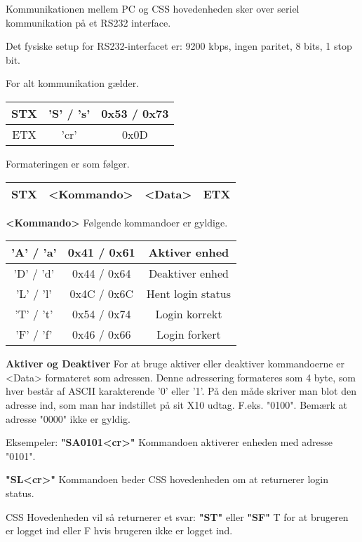 Kommunikationen mellem PC og CSS hovedenheden sker over seriel kommunikation på et RS232 interface.

Det fysiske setup for RS232-interfacet er: 9200 kbps, ingen paritet, 8 bits, 1 stop bit.

For alt kommunikation gælder.
\begin{tabular}{|c|c|c|}
\hline 
STX & 'S' / 's' & 0x53 / 0x73 \\ 
\hline 
ETX & 'cr' & 0x0D \\ 
\hline 
\end{tabular} 

Formateringen er som følger.

\begin{tabular}{|c|c|c|c|}
\hline 
STX & <Kommando> & <Data> & ETX \\ 
\hline 
\end{tabular} 

\textbf{<Kommando>}
Følgende kommandoer er gyldige.

\begin{tabular}{|c|c|c|}
\hline 
'A' / 'a' & 0x41 / 0x61 & Aktiver enhed \\ 
\hline 
'D' / 'd' & 0x44 / 0x64 & Deaktiver enhed \\ 
\hline 
'L' / 'l' & 0x4C / 0x6C & Hent login status \\ 
\hline 
'T' / 't' & 0x54 / 0x74 & Login korrekt \\ 
\hline 
'F' / 'f' & 0x46 / 0x66 & Login forkert \\ 
\hline
\end{tabular} 

\textbf{Aktiver og Deaktiver}
For at bruge aktiver eller deaktiver kommandoerne er <Data> formateret som adressen. Denne adressering formateres som 4 byte, som hver består af ASCII karakterende '0' eller '1'. På den måde skriver man blot den adresse ind, som man har indstillet på sit X10 udtag. F.eks. "0100".
Bemærk at adresse "0000" ikke er gyldig.

Eksempeler:
\textbf{"SA0101<cr>"}
Kommandoen aktiverer enheden med adresse "0101".

\textbf{"SL<cr>"}
Kommandoen beder CSS hovedenheden om at returnerer login status.

CSS Hovedenheden vil så returnerer et svar:
\textbf{"ST"} eller \textbf{"SF"}
T for at brugeren er logget ind eller F hvis brugeren ikke er logget ind.

